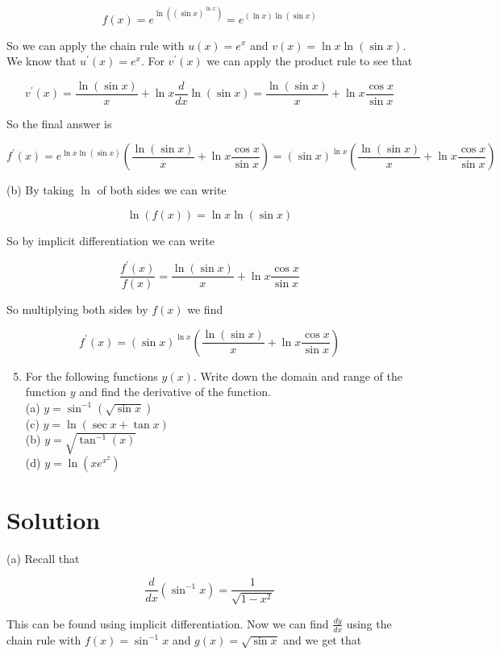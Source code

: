 \documentclass[10pt]{article}
\begin{document}
$$
f(x)=e^{\ln \left((\sin x)^{\ln x}\right)}=e^{(\ln x) \ln (\sin x)}
$$

So we can apply the chain rule with $u(x)=e^{x}$ and $v(x)=\ln x \ln (\sin x)$. We know that $u^{\prime}(x)=e^{x}$. For $v^{\prime}(x)$ we can apply the product rule to see that

$$
v^{\prime}(x)=\frac{\ln (\sin x)}{x}+\ln x \frac{d}{d x} \ln (\sin x)=\frac{\ln (\sin x)}{x}+\ln x \frac{\cos x}{\sin x}
$$

So the final answer is

$$
f^{\prime}(x)=e^{\ln x \ln (\sin x)}\left(\frac{\ln (\sin x)}{x}+\ln x \frac{\cos x}{\sin x}\right)=(\sin x)^{\ln x}\left(\frac{\ln (\sin x)}{x}+\ln x \frac{\cos x}{\sin x}\right)
$$

(b) By taking $\ln$ of both sides we can write

$$
\ln (f(x))=\ln x \ln (\sin x)
$$

So by implicit differentiation we can write

$$
\frac{f^{\prime}(x)}{f(x)}=\frac{\ln (\sin x)}{x}+\ln x \frac{\cos x}{\sin x}
$$

So multiplying both sides by $f(x)$ we find

$$
f^{\prime}(x)=(\sin x)^{\ln x}\left(\frac{\ln (\sin x)}{x}+\ln x \frac{\cos x}{\sin x}\right)
$$

\begin{enumerate}
  \setcounter{enumi}{4}
  \item For the following functions $y(x)$. Write down the domain and range of the function $y$ and find the derivative of the function.\\
(a) $y=\sin ^{-1}(\sqrt{\sin x})$\\
(c) $y=\ln (\sec x+\tan x)$\\
(b) $y=\sqrt{\tan ^{-1}(x)}$\\
(d) $y=\ln \left(x e^{x^{2}}\right)$
\end{enumerate}

\section*{Solution}
(a) Recall that

$$
\frac{d}{d x}\left(\sin ^{-1} x\right)=\frac{1}{\sqrt{1-x^{2}}}
$$

This can be found using implicit differentiation. Now we can find $\frac{d y}{d x}$ using the chain rule with $f(x)=\sin ^{-1} x$ and $g(x)=\sqrt{\sin x}$ and we get that
\end{document}
